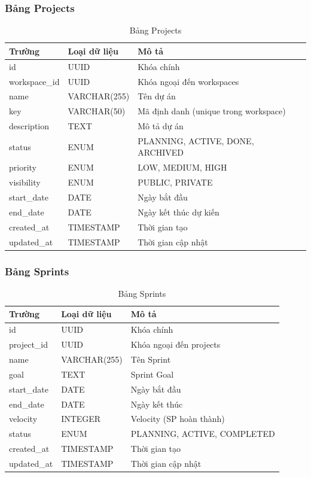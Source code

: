 \documentclass[12pt,a4paper]{report}
\begin{document}
\subsubsection{Bảng Projects}

\begin{table}[H]
\centering
\caption{Bảng Projects}
\begin{tabular}{|p{4cm}|p{3.5cm}|p{6cm}|}
\hline
\textbf{Trường} & \textbf{Loại dữ liệu} & \textbf{Mô tả} \\
\hline
id & UUID & Khóa chính \\
\hline
workspace\_id & UUID & Khóa ngoại đến workspaces \\
\hline
name & VARCHAR(255) & Tên dự án \\
\hline
key & VARCHAR(50) & Mã định danh (unique trong workspace) \\
\hline
description & TEXT & Mô tả dự án \\
\hline
status & ENUM & PLANNING, ACTIVE, DONE, ARCHIVED \\
\hline
priority & ENUM & LOW, MEDIUM, HIGH \\
\hline
visibility & ENUM & PUBLIC, PRIVATE \\
\hline
start\_date & DATE & Ngày bắt đầu \\
\hline
end\_date & DATE & Ngày kết thúc dự kiến \\
\hline
created\_at & TIMESTAMP & Thời gian tạo \\
\hline
updated\_at & TIMESTAMP & Thời gian cập nhật \\
\hline
\end{tabular}
\label{tab:projects_table}
\end{table}

\subsubsection{Bảng Sprints}

\begin{table}[H]
\centering
\caption{Bảng Sprints}
\begin{tabular}{|p{4cm}|p{3.5cm}|p{6cm}|}
\hline
\textbf{Trường} & \textbf{Loại dữ liệu} & \textbf{Mô tả} \\
\hline
id & UUID & Khóa chính \\
\hline
project\_id & UUID & Khóa ngoại đến projects \\
\hline
name & VARCHAR(255) & Tên Sprint \\
\hline
goal & TEXT & Sprint Goal \\
\hline
start\_date & DATE & Ngày bắt đầu \\
\hline
end\_date & DATE & Ngày kết thúc \\
\hline
velocity & INTEGER & Velocity (SP hoàn thành) \\
\hline
status & ENUM & PLANNING, ACTIVE, COMPLETED \\
\hline
created\_at & TIMESTAMP & Thời gian tạo \\
\hline
updated\_at & TIMESTAMP & Thời gian cập nhật \\
\hline
\end{tabular}
\label{tab:sprints_table}
\end{table}
\end{document}
